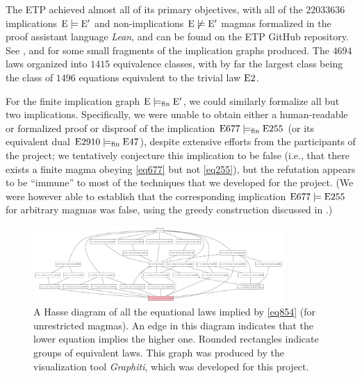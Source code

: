 The ETP achieved almost all of its primary objectives, with all of the $\num{22033636}$ implications ${\mathrm{E}} \models {\mathrm{E}'}$ and non-implications $\mathrm{E} \not \models {\mathrm{E}'}$ magmas formalized in the proof assistant language \emph{Lean}, and can be found on the ETP GitHub repository.  See ,  and  for some small fragments of the implication graphs produced.
The $\num{4694}$ laws organized into $\num{1415}$ equivalence classes, with by far the largest class being the class of $\num{1496}$ equations equivalent to the trivial law $\mathrm{E}2$.

For the finite implication graph ${\mathrm{E}} \models_{\mathrm{fin}} {\mathrm{E}'}$, we could similarly formalize all but two implications.  Specifically, we were unable to obtain either a human-readable or formalized proof or disproof of the implication $\mathrm{E}677 \models_{\mathrm{fin}} \mathrm{E}255$ (or its equivalent dual $\mathrm{E}2910 \models_{\mathrm{fin}} \mathrm{E}47$), despite extensive efforts from the participants of the project; we tentatively conjecture this implication to be false (i.e., that there exists a finite magma obeying \eqref{eq677} but not \eqref{eq255}), but the refutation appears to be ``immune'' to most of the techniques that we developed for the project.  (We were however able to establish that the corresponding implication $\mathrm{E}677 \models \mathrm{E}255$ for arbitrary magmas was false, using the greedy construction discussed in .)

\begin{figure}
\centering
\includegraphics[width=0.85\textwidth]{854.png}
\caption{A Hasse diagram of all the equational laws implied by \eqref{eq854} (for unrestricted magmas).  An edge in this diagram indicates that the lower equation implies the higher one. Rounded rectangles indicate groups of equivalent laws.  This graph was produced by the visualization tool \emph{Graphiti}, which was developed for this project.}
\label{fig:854}
\end{figure}

